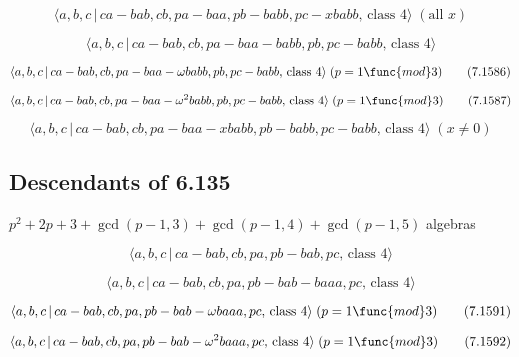 \documentclass[10pt]{article}
\begin{document}
\begin{equation}
\langle a,b,c\,|\,ca-bab,cb,pa-baa,pb-babb,pc-xbabb,\,\text{class }4\rangle
\;(\text{all }x)  \tag{7.1584}
\end{equation}

\begin{equation}
\langle a,b,c\,|\,ca-bab,cb,pa-baa-babb,pb,pc-babb,\,\text{class }4\rangle 
\tag{7.1585}
\end{equation}

\begin{equation}
\langle a,b,c\,|\,ca-bab,cb,pa-baa-\omega babb,pb,pc-babb,\,\text{class }%
4\rangle \;(p=1\func{mod}3)  \tag{7.1586}
\end{equation}

\begin{equation}
\langle a,b,c\,|\,ca-bab,cb,pa-baa-\omega ^{2}babb,pb,pc-babb,\,\text{class }%
4\rangle \;(p=1\func{mod}3)  \tag{7.1587}
\end{equation}

\begin{equation}
\langle a,b,c\,|\,ca-bab,cb,pa-baa-xbabb,pb-babb,pc-babb,\,\text{class }%
4\rangle \;(x \neq 0)  \tag{7.1588}
\end{equation}

\subsection{Descendants of 6.135}

$p^{2}+2p+3+\gcd (p-1,3)+\gcd (p-1,4)+\gcd (p-1,5)$ algebras

\begin{equation}
\langle a,b,c\,|\,ca-bab,cb,pa,pb-bab,pc,\,\text{class }4\rangle 
\tag{7.1589}
\end{equation}

\begin{equation}
\langle a,b,c\,|\,ca-bab,cb,pa,pb-bab-baaa,pc,\,\text{class }4\rangle 
\tag{7.1590}
\end{equation}

\begin{equation}
\langle a,b,c\,|\,ca-bab,cb,pa,pb-bab-\omega baaa,pc,\,\text{class }4\rangle
\;(p=1\func{mod}3)  \tag{7.1591}
\end{equation}

\begin{equation}
\langle a,b,c\,|\,ca-bab,cb,pa,pb-bab-\omega ^{2}baaa,pc,\,\text{class }%
4\rangle \;(p=1\func{mod}3)  \tag{7.1592}
\end{equation}
\end{document}
